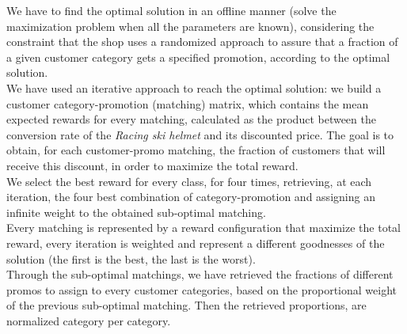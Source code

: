 We have to find the optimal solution in an offline manner (solve the maximization problem when all the parameters are known), considering the constraint that the shop uses a randomized approach to assure that a fraction of a given customer category gets a specified promotion, according to the optimal solution.\\ 
We have used an iterative approach to reach the optimal solution: we build a customer category-promotion (matching) matrix, which contains the mean expected rewards for every matching, calculated as the product between the conversion rate of the \textit{Racing ski helmet} and its discounted price.
The goal is to obtain, for each customer-promo matching, the fraction of customers that will receive this discount, in order to maximize the total reward.\\
We select the best reward for every class, for four times, retrieving, at each iteration, the four best combination of category-promotion and assigning an infinite weight to the obtained sub-optimal matching.\\
Every matching is represented by a reward configuration that maximize the total reward, every iteration is weighted and represent a different goodnesses of the solution (the first is the best, the last is the worst).\\
Through the sub-optimal matchings, we have retrieved the fractions of different promos to assign to every customer categories, based on the proportional weight of the previous sub-optimal matching. Then the retrieved proportions, are normalized category per category.

